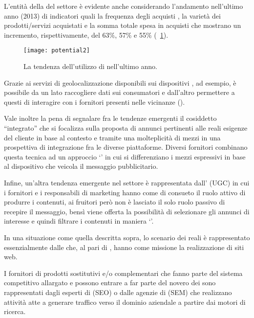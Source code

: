 L'entità della  del settore è evidente anche considerando l'andamento nell'ultimo anno (2013) di indicatori quali la frequenza degli acquisti , la varietà dei prodotti/servizi acquistati e la somma totale spesa in acquisti  che mostrano un incremento, rispettivamente, del 63\%, 57\% e 55\% (\figurename~\ref{fig:potential2}).

\begin{figure}[H]
  \centering
  \texttt{[image: potential2]}
  \caption{La tendenza dell'utilizzo di  nell'ultimo anno.}
  \label{fig:potential2}
\end{figure}

Grazie ai servizi di geolocalizzazione disponibili sui dispositivi , ad esempio, è possibile da un lato raccogliere dati sui consumatori e dall'altro permettere a questi di interagire con i fornitori presenti nelle vicinanze ().

Vale inoltre la pena di segnalare fra le tendenze emergenti il cosiddetto ``\mktg integrato'' che si focalizza sulla proposta di annunci pertinenti alle reali esigenze del cliente in base al contesto e tramite una molteplicità di mezzi in una prospettiva di integrazione fra le diverse piattaforme. Diversi fornitori combinano questa tecnica ad un approccio `' in cui si differenziano i mezzi espressivi in base al dispositivo che veicola il messaggio pubblicitario.

Infine, un'altra tendenza emergente nel settore è rappresentata dall' (UGC) in cui i fornitori e i responsabili di marketing hanno come di consueto il ruolo attivo di produrre i contenuti,  ai fruitori però non è lasciato il solo ruolo passivo di recepire il messaggio, bensì viene offerta la possibilità di selezionare gli annunci di interesse e quindi filtrare i contenuti in maniera `'.

In una situazione come quella descritta sopra, lo scenario dei  reali è rappresentato essenzialmente dalle  che, al pari di \customer, hanno come missione la realizzazione di siti web.

I fornitori di prodotti sostitutivi e/o complementari che fanno parte del sistema competitivo allargato e possono entrare a far parte del novero dei  sono rappresentati dagli esperti di  (SEO) o dalle agenzie di  (SEM) che realizzano attività atte a generare traffico verso il dominio aziendale a partire dai motori di ricerca.

